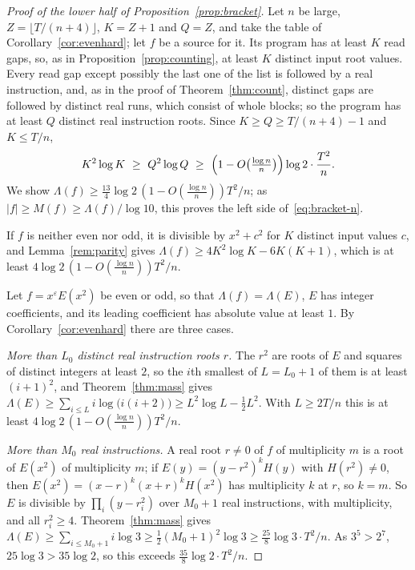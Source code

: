 \documentclass[11pt]{article}
\theoremstyle{remark}
\begin{document}
\begin{proof}[Proof of the lower half of Proposition~\ref{prop:bracket}]
Let $n$ be large, $Z=\lfloor T/(n+4)\rfloor$, $K=Z+1$ and $Q=Z$, and take the table of
Corollary~\ref{cor:evenhard}; let $f$ be a source for it.  Its program has at least $K$
read gaps, so, as in Proposition~\ref{prop:counting}, at least $K$ distinct input root
values.  Every read gap except possibly the last one of the list is followed by a real
instruction, and, as in the proof of Theorem~\ref{thm:count}, distinct gaps are followed
by distinct real runs, which consist of whole blocks; so the program has at least $Q$
distinct real instruction roots.  Since $K\ge Q\ge T/(n+4)-1$ and $K\le T/n$,
\[
  K^2\log K\ \ge\ Q^2\log Q\ \ge\ \Bigl(1-O\bigl(\tfrac{\log n}n\bigr)\Bigr)\log2\cdot\frac{T^2}n .
\]
We show $\Lambda(f)\ge\frac{13}4\log2\,(1-O(\frac{\log n}n))T^2/n$; as
$|f|\ge M(f)\ge\Lambda(f)/\log10$, this proves the left side of~\eqref{eq:bracket-n}.

If $f$ is neither even nor odd, it is divisible by $x^2+c^2$ for $K$ distinct input values
$c$, and Lemma~\ref{rem:parity} gives $\Lambda(f)\ge4K^2\log K-6K(K+1)$, which is at least
$4\log2\,(1-O(\frac{\log n}n))T^2/n$.

Let $f=x^\varepsilon E(x^2)$ be even or odd, so that $\Lambda(f)=\Lambda(E)$, $E$ has
integer coefficients, and its leading coefficient has absolute value at least $1$.  By
Corollary~\ref{cor:evenhard} there are three cases.

\emph{More than $L_0$ distinct real instruction roots $r$.}  The $r^2$ are roots of $E$
and squares of distinct integers at least $2$, so the $i$th smallest of $L=L_0+1$ of them
is at least $(i+1)^2$, and Theorem~\ref{thm:mass} gives
$\Lambda(E)\ge\sum_{i\le L}i\log\bigl(i(i+2)\bigr)\ge L^2\log L-\frac12L^2$.  With
$L\ge2T/n$ this is at least $4\log2\,(1-O(\frac{\log n}n))T^2/n$.

\emph{More than $M_0$ real instructions.}  A real root $r\ne0$ of $f$ of multiplicity $m$
is a root of $E(x^2)$ of multiplicity $m$; if $E(y)=(y-r^2)^kH(y)$ with $H(r^2)\ne0$, then
$E(x^2)=(x-r)^k(x+r)^kH(x^2)$ has multiplicity $k$ at $r$, so $k=m$.  So $E$ is divisible
by $\prod_i(y-r_i^2)$ over $M_0+1$ real instructions, with multiplicity, and all
$r_i^2\ge4$.  Theorem~\ref{thm:mass} gives
$\Lambda(E)\ge\sum_{i\le M_0+1}i\log3\ge\frac12(M_0+1)^2\log3\ge\frac{25}8\log3\cdot T^2/n$.
As $3^5>2^7$, $25\log3>35\log2$, so this exceeds $\frac{35}8\log2\cdot T^2/n$.


\end{proof}
\end{document}
